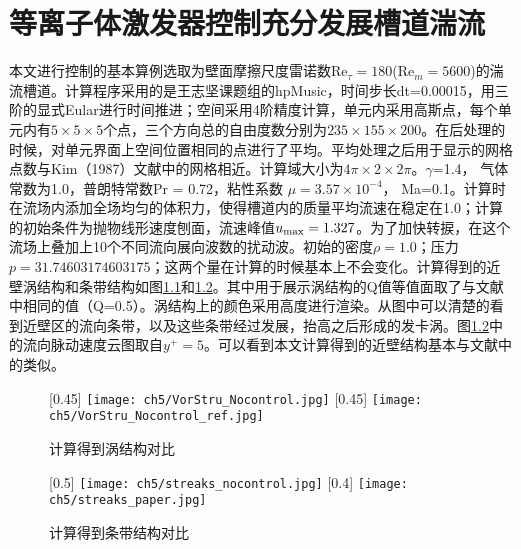 \chapter{等离子体激发器控制充分发展槽道湍流}
本文进行控制的基本算例选取为壁面摩擦尺度雷诺数Re$_\tau=180$(Re$_m=5600$)的湍流槽道。计算程序采用的是王志坚课题组的hpMusic\cite{WangZJ2009,Zhu2016,Zh2017}，时间步长dt=0.00015，用三阶的显式Eular进行时间推进；空间采用4阶精度计算，单元内采用高斯点，每个单元内有$5\times5\times5$个点，三个方向总的自由度数分别为$235\times155\times200$。在后处理的时候，对单元界面上空间位置相同的点进行了平均。平均处理之后用于显示的网格点数与Kim（1987）\cite{Kim1987}文献中的网格相近。计算域大小为$4\pi \times 2\times 2\pi$。$\gamma$=1.4， 气体常数为1.0，普朗特常数Pr = 0.72，粘性系数 $\mu=3.57\times10^{-4}$， Ma=0.1。计算时在流场内添加全场均匀的体积力，使得槽道内的质量平均流速在稳定在1.0；计算的初始条件为抛物线形速度刨面，流速峰值$u_{\rm max} = 1.327$。为了加快转捩，在这个流场上叠加上10个不同流向展向波数的扰动波。初始的密度$\rho=1.0$；压力$p= 31.74603174603175$；这两个量在计算的时候基本上不会变化。计算得到的近壁涡结构和条带结构如图\ref{f:nearwallvortex}和\ref{f:nearwallstreak}。其中用于展示涡结构的Q值等值面取了与文献中相同的值（Q=0.5）。涡结构上的颜色采用高度进行渲染。从图中可以清楚的看到近壁区的流向条带，以及这些条带经过发展，抬高之后形成的发卡涡。图\ref{f:nearwallstreak}中的流向脉动速度云图取自$y^+=5$。可以看到本文计算得到的近壁结构基本与文献中的类似。
\begin{figure}[htb]
  \centering
  [0.45\textwidth] %
    {\texttt{[image: ch5/VorStru\_Nocontrol.jpg]}}%
  [0.45\textwidth]
    {\texttt{[image: ch5/VorStru\_Nocontrol\_ref.jpg]}}%
  \caption{计算得到涡结构对比}\label{f:nearwallvortex}
\end{figure}
\begin{figure}[htb]
  \centering
  [0.5\textwidth] %
    {\texttt{[image: ch5/streaks\_nocontrol.jpg]}}%
  [0.4\textwidth]
    {\texttt{[image: ch5/streaks\_paper.jpg]}}%
  \caption{计算得到条带结构对比}\label{f:nearwallstreak}
\end{figure}

